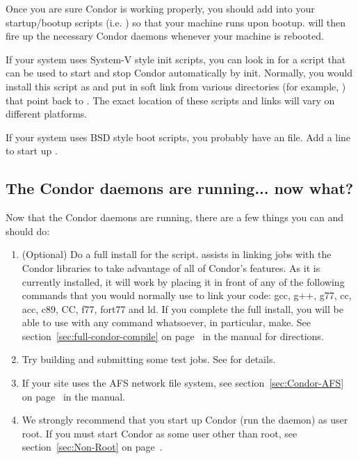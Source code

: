 Once you are sure Condor is working properly, you should add
 into your startup/bootup scripts (i.e.  ) so
that your machine runs  upon bootup.  
will then fire up the necessary Condor daemons whenever your machine
is rebooted.  

If your system uses System-V style init scripts, you can look in
 for a script that can be used
to start and stop Condor automatically by init.  Normally, you would
install this script as  and put in soft link from
various directories (for example, ) that point back to
.  The exact location of these scripts and links
will vary on different platforms.

If your system uses BSD style boot scripts, you probably have an
 file.  Add a line to start up
.


\subsection{\label{sec:Running-Now-What}The Condor daemons are
running... now what?} 

Now that the Condor daemons are running, there are a few things you
can and should do:

\begin{enumerate}
\item (Optional) Do a full install for the  script.
     assists in linking jobs with the Condor libraries
    to take advantage of all of Condor's features.  As it is currently
    installed, it will work by placing it in front of any of the
    following commands that you would normally use to link your code:
    gcc, g++, g77, cc, acc, c89, CC, f77, fort77 and ld.  If you
    complete the full install, you will be able to use
     with any command whatsoever, in particular, make.
    See section~\ref{sec:full-condor-compile} on
    page~\pageref{sec:full-condor-compile} in the manual for
    directions.

\item Try building and submitting some test jobs.  See
     for details.

\item If your site uses the AFS network file system, see
section~\ref{sec:Condor-AFS} on page~\pageref{sec:Condor-AFS} in the
manual.

\item We strongly recommend that you start up Condor (run the
 daemon) as user root.  If you must start Condor as
some user other than root, see section~\ref{sec:Non-Root} on
page~\pageref{sec:Non-Root}.

\end{enumerate}

